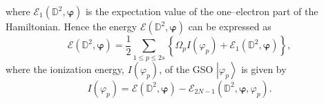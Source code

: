\documentclass[aps,preprint]{revtex4}%
\begin{document}
where $\mathcal{E}_{1}\left(  \mathbb{D}^{2},\mathbf{\varphi}\right)  $ is the
expectation value of the one--electron part of the Hamiltonian. Hence the
energy $\mathcal{E}\left(  \mathbb{D}^{2},\mathbf{\varphi}\right)  $ can be
expressed as
\begin{equation}
\mathcal{E}\left(  \mathbb{D}^{2},\mathbf{\varphi}\right)  =\frac{1}{2}%
\sum_{1\leq p\leq2s}\left\{  \Omega_{p}I\left(  \varphi_{p}\right)
+\mathcal{E}_{1}\left(  \mathbb{D}^{2},\mathbf{\varphi}\right)  \right\}  ,
\label{TEexpec}%
\end{equation}
where the ionization energy, $I\left(  \varphi_{p}\right)  $, of the GSO
$\left\vert \varphi_{p}\right\rangle $ is given by
\begin{equation}
I\left(  \varphi_{p}\right)  =\mathcal{E}\left(  \mathbb{D}^{2}%
,\mathbf{\varphi}\right)  -\mathcal{E}_{2N-1}\left(  \mathbb{D}^{2}%
,\mathbf{\varphi},\varphi_{p}\right)  .
\end{equation}
\end{document}
